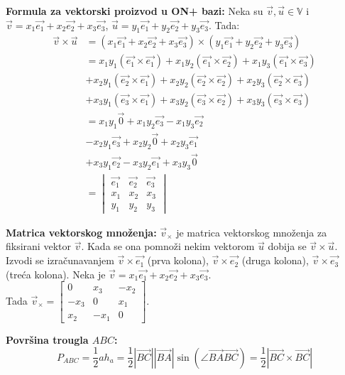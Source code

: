 \documentclass[12pt]{article}
\newcommand{\vek}[1]{\overrightarrow{#1}}
\begin{document}
\textbf{Formula za vektorski proizvod u ON+ bazi:} Neka su $\vek{v},\vek{u}\in
    \mathbb{V}$ i $\vek{v}=x_1\vek{e_1}+x_2\vek{e_2}+x_3\vek{e_3}$, $\vek{u}=
    y_1\vek{e_1}+y_2\vek{e_2}+y_3\vek{e_3}$. Tada:
\begin{align*}
    \vek{v}\times\vek{u} & = (x_1\vek{e_1}+x_2\vek{e_2}+x_3\vek{e_3})\times(y_1\vek{e_1}+y_2\vek{e_2}+y_3\vek{e_3})            \\
                         & =x_1y_1(\vek{e_1}\times\vek{e_1})+x_1y_2(\vek{e_1}\times\vek{e_2})+x_1y_3(\vek{e_1}\times\vek{e_3}) \\
                         & +x_2y_1(\vek{e_2}\times\vek{e_1})+x_2y_2(\vek{e_2}\times\vek{e_2})+x_2y_3(\vek{e_2}\times\vek{e_3}) \\
                         & +x_3y_1(\vek{e_3}\times\vek{e_1})+x_3y_2(\vek{e_3}\times\vek{e_2})+x_3y_3(\vek{e_3}\times\vek{e_3}) \\
                         & =x_1y_1\vek{0}+x_1y_2\vek{e_3}-x_1y_3\vek{e_2}                                                      \\
                         & -x_2y_1\vek{e_3}+x_2y_2\vek{0}+x_2y_3\vek{e_1}                                                      \\
                         & +x_3y_1\vek{e_2}-x_3y_2\vek{e_1}+x_3y_3\vek{0}                                                      \\
                         & = \begin{vmatrix}
                                 \vek{e_1} & \vek{e_2} & \vek{e_3} \\
                                 x_1       & x_2       & x_3       \\
                                 y_1       & y_2       & y_3
                             \end{vmatrix}
\end{align*}
\par

\textbf{Matrica vektorskog množenja:} $\vek{v}_\times$ je matrica vektorskog
množenja za fiksirani vektor $\vek{v}$. Kada se ona pomnoži nekim vektorom
$\vek{u}$ dobija se $\vek{v}\times\vek{u}$. Izvodi se izračunavanjem
$\vek{v}\times\vek{e_1}$ (prva kolona), $\vek{v}\times\vek{e_2}$
(druga kolona), $\vek{v}\times\vek{e_3}$ (treća kolona). Neka je
$\vek{v}=x_1\vek{e_1}+x_2\vek{e_2}+x_3\vek{e_3}$.\\
Tada  $\vek{v}_\times=
    \begin{bmatrix}
        0    & x_3  & -x_2 \\
        -x_3 & 0    & x_1  \\
        x_2  & -x_1 & 0
    \end{bmatrix}$.
\par
\textbf{Površina trougla $ABC$:}
$$P_{ABC}=\frac{1}{2}ah_a=\frac{1}{2} |\vek{BC}||\vek{BA}|\sin(\angle\vek{BA}\vek{BC})=\frac{1}{2} |\vek{BC}\times\vek{BC}|$$
\par
\end{document}
